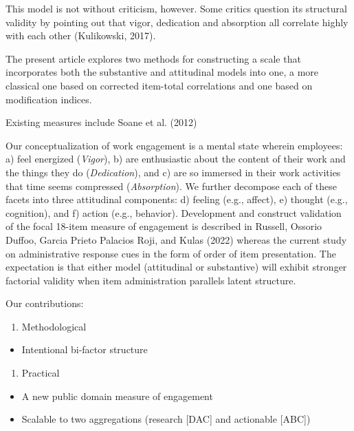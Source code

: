 \documentclass[
  man]{apa6}
\providecommand{\tightlist}{%
  \setlength{\itemsep}{0pt}\setlength{\parskip}{0pt}}
\begin{document}
This model is not without criticism, however. Some critics question its structural validity by pointing out that vigor, dedication and absorption all correlate highly with each other (Kulikowski, 2017).

The present article explores two methods for constructing a scale that incorporates both the substantive and attitudinal models into one, a more classical one based on corrected item-total correlations and one based on modification indices.

Existing measures include Soane et al. (2012)

Our conceptualization of work engagement is a mental state wherein employees: a) feel energized (\emph{Vigor}), b) are enthusiastic about the content of their work and the things they do (\emph{Dedication}), and c) are so immersed in their work activities that time seems compressed (\emph{Absorption}). We further decompose each of these facets into three attitudinal components: d) feeling (e.g., affect), e) thought (e.g., cognition), and f) action (e.g., behavior). Development and construct validation of the focal 18-item measure of engagement is described in Russell, Ossorio Duffoo, Garcia Prieto Palacios Roji, and Kulas (2022) whereas the current study on administrative response cues in the form of order of item presentation. The expectation is that either model (attitudinal or substantive) will exhibit stronger factorial validity when item administration parallels latent structure.

Our contributions:

\begin{enumerate}
\def\labelenumi{\arabic{enumi}.}
\tightlist
\item
  Methodological
\end{enumerate}

\begin{itemize}
\tightlist
\item
  Intentional bi-factor structure
\end{itemize}

\begin{enumerate}
\def\labelenumi{\arabic{enumi}.}
\setcounter{enumi}{1}
\tightlist
\item
  Practical
\end{enumerate}

\begin{itemize}
\tightlist
\item
  A new public domain measure of engagement
\item
  Scalable to two aggregations (research {[}DAC{]} and actionable {[}ABC{]})
\end{itemize}
\end{document}
